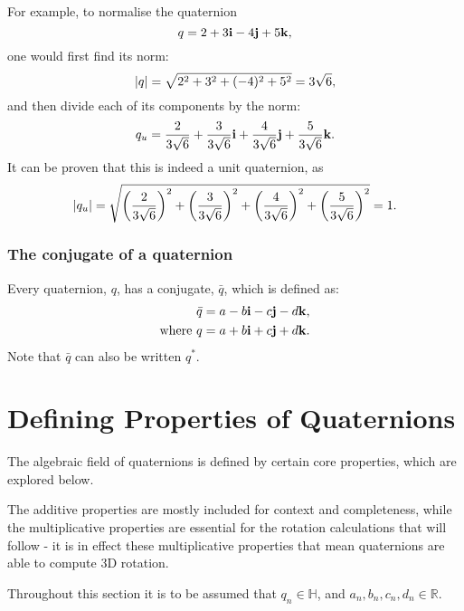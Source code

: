 \documentclass[12pt]{article}
\theoremstyle{definition}
\begin{document}
For example, to normalise the quaternion
\begin{equation}
    q = 2 + 3\vb{i} - 4\vb{j} + 5\vb{k},
\end{equation}
one would first find its norm:
\begin{equation}
    \abs{q} = \sqrt{2^2 + 3^2 + (-4)^2 + 5^2} = 3\sqrt{6},
\end{equation}
and then divide each of its components by the norm:
\begin{equation}
    q_u = \frac{2}{3\sqrt{6}}+\frac{3}{3\sqrt{6}}\vb{i}+\frac{4}{3\sqrt{6}}\vb{j}+\frac{5}{3\sqrt{6}}\vb{k}.
\end{equation}
It can be proven that this is indeed a unit quaternion, as
\begin{equation}
    \abs{q_u} = \sqrt{\left(\frac{2}{3\sqrt{6}}\right)^2+\left(\frac{3}{3\sqrt{6}}\right)^2+\left(\frac{4}{3\sqrt{6}}\right)^2+\left(\frac{5}{3\sqrt{6}}\right)^2} = 1.
\end{equation}

\subsubsection{The conjugate of a quaternion}

Every quaternion, $q$, has a conjugate, $\bar{q}$, which is defined as:
\begin{equation}
    \begin{aligned}
        &\bar{q} = a - b\vb{i} - c\vb{j} - d\vb{k}, \\
        \text{where } & q = a + b\vb{i} + c\vb{j} + d\vb{k}.
    \end{aligned}
\end{equation}
Note that $\bar{q}$ can also be written $q^*$. \cite{DRose}

\pagebreak
\section{Defining Properties of Quaternions}

The algebraic field of quaternions is defined by certain core properties, which are explored below.

The additive properties are mostly included for context and completeness, while the multiplicative properties are essential for the rotation calculations that will follow - it is in effect these multiplicative properties that mean quaternions are able to compute 3D rotation.

Throughout this section it is to be assumed that $q_n \in \mathbb{H}$, and $a_n, b_n, c_n, d_n \in \mathbb{R}$.
\end{document}
